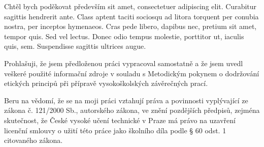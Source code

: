 \documentclass[czech,bachelor,oneside, draft]{ctufit-thesis}
\begin{document}
\frontmatter\frontmatterinit %

\thispagestyle{empty}\maketitle\thispagestyle{empty}\cleardoublepage %


\imprintpage %
\stopTOCentries

\begin{acknowledgmentpage}
	Chtěl bych poděkovat především sit amet, consectetuer adipiscing elit. Curabitur sagittis hendrerit ante. Class aptent taciti sociosqu ad litora torquent per conubia nostra, per inceptos hymenaeos. Cras pede libero, dapibus nec, pretium sit amet, tempor quis. Sed vel lectus. Donec odio tempus molestie, porttitor ut, iaculis quis, sem. Suspendisse sagittis ultrices augue.
\end{acknowledgmentpage}


\begin{declarationpage}
	Prohlašuji, že jsem předloženou práci vypracoval samostatně a že jsem uvedl veškeré
    použité informační zdroje v souladu s Metodickým pokynem o dodržování etických
    principů při přípravě vysokoškolských závěrečných prací.
    
    Beru na vědomí, že se na moji práci vztahují práva a povinnosti vyplývající ze zákona č. 121/2000 Sb., autorského zákona, ve znění pozdějších předpisů, zejména
    skutečnost, že České vysoké učení technické v Praze má právo na uzavření licenční
    smlouvy o užití této práce jako školního díla podle § 60 odst. 1 citovaného zákona.
\end{declarationpage}
\end{document}
